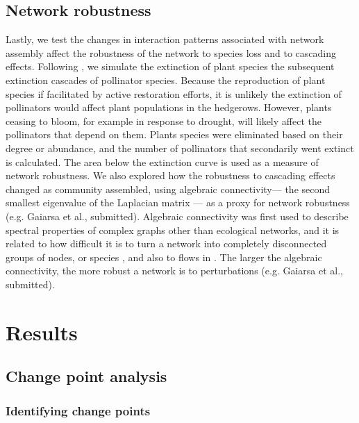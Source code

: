 \documentclass[12pt]{article}
\begin{document}
\subsection*{Network robustness}
Lastly, we test the changes in interaction patterns associated with
network assembly affect the robustness of the network to species
loss and to cascading effects. Following \cite{Memmott2004}, we simulate the extinction of
plant species the subsequent extinction cascades of pollinator
species. Because the reproduction of plant species if facilitated by
active restoration efforts, it is unlikely the extinction of
pollinators would affect plant populations in the hedgerows. However,
plants ceasing to bloom, for example in response to drought, will
likely affect the pollinators that depend on them. Plants species were
eliminated based on their degree or abundance, and the number of
pollinators that secondarily went extinct is calculated. The area
below the extinction curve is used as a measure of network robustness. %
We also explored how the robustness to cascading effects changed as community assembled, using algebraic connectivity--- the second smallest eigenvalue of the Laplacian matrix \citep{fiedler1973algebraic}--- as a proxy for network robustness (e.g. Gaiarsa et al., submitted). Algebraic connectivity was first used to describe spectral properties of complex graphs other than ecological networks, and it is related to how difficult it is to turn a network into completely disconnected groups of nodes, or species \citep{fiedler1973algebraic, costa2007characterization}, and also to flows in . The larger the algebraic connectivity, the more robust a network is to perturbations (e.g. Gaiarsa et al., submitted). 

\section*{Results}
\label{sec:results}
\subsection*{Change point analysis}
\subsubsection*{Identifying change points}
\end{document}
